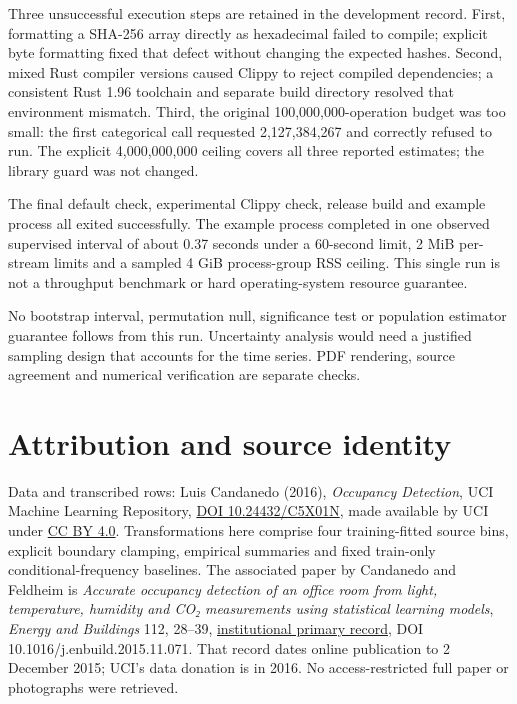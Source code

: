 Three unsuccessful execution steps are retained in the development record. First, formatting a SHA-256 array directly as hexadecimal failed to compile; explicit byte formatting fixed that defect without changing the expected hashes. Second, mixed Rust compiler versions caused Clippy to reject compiled dependencies; a consistent Rust 1.96 toolchain and separate build directory resolved that environment mismatch. Third, the original 100,000,000-operation budget was too small: the first categorical call requested 2,127,384,267 and correctly refused to run. The explicit 4,000,000,000 ceiling covers all three reported estimates; the library guard was not changed.

The final default check, experimental Clippy check, release build and example process all exited successfully. The example process completed in one observed supervised interval of about 0.37 seconds under a 60-second limit, 2 MiB per-stream limits and a sampled 4 GiB process-group RSS ceiling. This single run is not a throughput benchmark or hard operating-system resource guarantee.

No bootstrap interval, permutation null, significance test or population estimator guarantee follows from this run. Uncertainty analysis would need a justified sampling design that accounts for the time series. PDF rendering, source agreement and numerical verification are separate checks.

\par{}

\section{Attribution and source identity}\label{attribution-and-source-identity}

Data and transcribed rows: Luis Candanedo (2016), \emph{Occupancy Detection}, UCI Machine Learning Repository, \href{https://doi.org/10.24432/C5X01N}{DOI 10.24432/C5X01N}, made available by UCI under \href{https://creativecommons.org/licenses/by/4.0/}{CC BY 4.0}. Transformations here comprise four training-fitted source bins, explicit boundary clamping, empirical summaries and fixed train-only conditional-frequency baselines. The associated paper by Candanedo and Feldheim is \emph{Accurate occupancy detection of an office room from light, temperature, humidity and CO₂ measurements using statistical learning models}, \emph{Energy and Buildings} 112, 28--39, \href{https://orbi.umons.ac.be/handle/20.500.12907/17305?locale=fr}{institutional primary record}, DOI 10.1016/j.enbuild.2015.11.071. That record dates online publication to 2 December 2015; UCI's data donation is in 2016. No access-restricted full paper or photographs were retrieved.


